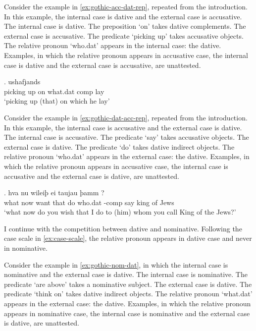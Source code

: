 Consider the example in \ref{ex:gothic-acc-dat-rep}, repeated from the introduction. In this example, the internal case is dative and the external case is accusative.
The internal case is dative. The preposition  `on' takes dative complements.
The external case is accusative. The predicate  `picking up' takes accusative objects.
The relative pronoun  `who.\ac{dat}' appears in the internal case: the dative.
Examples, in which the relative pronoun appears in accusative case, the internal case is dative and the external case is accusative, are unattested.

\exg. ushafjands    \\
 {picking up}\scsub{[acc]} on\scsub{[dat]} what.\ac{dat} \-\ac{comp} lay\\
 `picking up (that) on which he lay' \label{ex:gothic-acc-dat-rep}

Consider the example in \ref{ex:gothic-dat-acc-rep}, repeated from the introduction. In this example, the internal case is accusative and the external case is dative.
The internal case is accusative. The predicate  `say' takes accusative objects.
The external case is dative. The predicate  `do' takes dative indirect objects.
The relative pronoun  `who.\ac{dat}' appears in the external case: the dative.
Examples, in which the relative pronoun appears in accusative case, the internal case is accusative and the external case is dative, are unattested.

\exg. hva nu wileiþ ei taujau þamm    ?\\
 what now want that do\scsub{[dat]} who.\ac{dat} -\ac{comp} say\scsub{[acc]} king {of Jews}\\
 `what now do you wish that I do to (him) whom you call King of the Jews?' \label{ex:gothic-dat-acc-rep}

I continue with the competition between dative and nominative. Following the case scale in \ref{ex:case-scale}, the relative pronoun appears in dative case and never in nominative.

Consider the example in \ref{ex:gothic-nom-dat}, in which the internal case is nominative and the external case is dative.
The internal case is nominative. The predicate  `are above' takes a nominative subject.
The external case is dative. The predicate  `think on' takes dative indirect objects.
The relative pronoun  `what.\ac{dat}' appears in the external case: the dative.
Examples, in which the relative pronoun appears in nominative case, the internal case is nominative and the external case is dative, are unattested.

